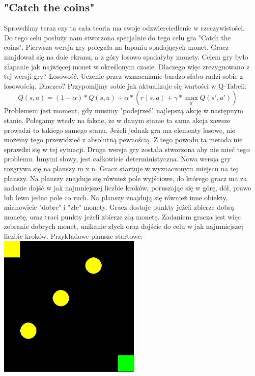 \documentclass[a4paper,12pt]{article}
\begin{document}
\subsection{"Catch the coins"}

Sprawdźmy teraz czy ta cała teoria ma swoje odzwierciedlenie w rzeczywistości. Do tego celu posłuży nam stworzona specjalnie do tego celu gra "Catch the coins".
Pierwsza wersja gry polegała na łapaniu spadających monet. Gracz znajdował się na dole ekranu, a z góry losowo spadałyby monety. Celem gry było złapanie jak najwięcej monet w określonym czasie. Dlaczego więc zrezygnowano z tej wersji gry? Losowość.
Uczenie przez wzmacnianie bardzo słabo radzi sobie z losowością. Dlaczeo? Przypomijmy sobie jak aktualizuje się wartości w Q-Tabeli:
\[ Q(s, a) =  (1 - \alpha )*Q(s, a) + \alpha * ( r(s, a) + \gamma * \max_{a'}Q(s', a') )\]
\newline Problemem jest moment, gdy musimy "podejrzeć" najlepszą akcję w następnym stanie. Polegamy wtedy na fakcie, że w danym stanie ta sama akcja zawsze prowadzi to takiego samego stanu. Jeżeli jednak gra ma elementy losowe, nie możemy tego przewidzieć z absolutną pewnością. Z tego powodu ta metoda nie sprawdzi się w tej sytuacji. Druga wersja gry została stworzona aby nie mieć tego problemu. Innymi słowy, jest całkowicie deterministyczna.
\newline \newline
Nowa wersja gry rozgrywa się na planszy m x n. Gracz startuje w wyznaczonym miejscu na tej planszy. Na planszy znajduje się również pole wyjściowe, do którego gracz ma za zadanie dojść w jak najmniejszej liczbie kroków, poruszając się w górę, dół, prawo lub lewo jedno pole co ruch. Na planszy znajdują się również inne obiekty, mianowicie "dobre" i "złe" monety. Gracz dostaje punkty jeżeli zbierze dobrą monetę, oraz traci punkty jeżeli zbierze złą monetę. Zadaniem gracza jest więc zebranie dobrych monet, unikanie złych oraz dojście do celu w jak najmniejszej liczbie kroków.
\newline Przykładowe plansze startowe: \newline
\includegraphics[width=70mm]{przyklad1.png}
\end{document}
